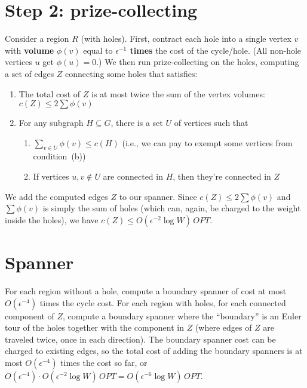 \documentclass{article}
\begin{document}
\section{Step 2: prize-collecting}

Consider a region $R$ (with holes). First, contract each hole into a single vertex $v$ with \textbf{volume} $\phi(v)$ equal to \textbf{$\epsilon^{-1}$ times} the cost of the cycle/hole. (All non-hole vertices $u$ get $\phi(u)=0$.) We then run prize-collecting on the holes, computing a set of edges $Z$ connecting some holes that satisfies:
 \begin{enumerate}
 \item The total cost of $Z$ is at most twice the sum of the vertex volumes: $c(Z)\le2\sum\phi(v)$
 \item For any subgraph $H\subseteq G$, there is a set $U$ of vertices such that
  \begin{enumerate}
  \item $\sum_{v\in U}\phi(v)\le c(H)$ (i.e., we can pay to exempt some vertices from condition~(b))
  \item If vertices $u,v\notin U$ are connected in $H$, then they're connected in $Z$
  \end{enumerate}
 \end{enumerate}

We add the computed edges $Z$ to our spanner. Since $c(Z)\le2\sum\phi(v)$ and $\sum\phi(v)$ is simply the sum of holes (which can, again, be charged to the weight inside the holes), we have $c(Z)\le O(\epsilon^{-2}\log W)\,OPT$.

\section{Spanner}
For each region without a hole, compute a boundary spanner of cost at most $O(\epsilon^{-4})$ times the cycle cost. For each region with holes, for each connected component of $Z$, compute a boundary spanner where the ``boundary'' is an Euler tour of the holes together with the component in $Z$ (where edges of $Z$ are traveled twice, once in each direction). The boundary spanner cost can be charged to existing edges, so the total cost of adding the boundary spanners is at most $O(\epsilon^{-4})$ times the cost so far, or $O(\epsilon^{-4})\cdot  O(\epsilon^{-2}\log W)\,OPT= O(\epsilon^{-6}\log W)\,OPT$.
\end{document}
